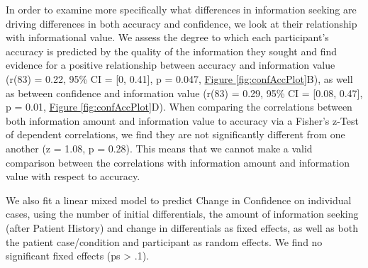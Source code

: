 \documentclass[a4paper, nobind]{templates/ociamthesis}
\begin{document}
\hfill\break
In order to examine more specifically what differences in information seeking are driving differences in both accuracy and confidence, we look at their relationship with informational value. We assess the degree to which each participant's accuracy is predicted by the quality of the information they sought and find evidence for a positive relationship between accuracy and information value (r(83) = 0.22, 95\% CI = {[}0, 0.41{]}, p = 0.047, \hyperref[fig:confAccPlot]{Figure \ref{fig:confAccPlot}}B), as well as between confidence and information value (r(83) = 0.29, 95\% CI = {[}0.08, 0.47{]}, p = 0.01, \hyperref[fig:confAccPlot]{Figure \ref{fig:confAccPlot}}D). When comparing the correlations between both information amount and information value to accuracy via a Fisher's z-Test of dependent correlations, we find they are not significantly different from one another (z = 1.08, p = 0.28). This means that we cannot make a valid comparison between the correlations with information amount and information value with respect to accuracy.

\hfill\break
We also fit a linear mixed model to predict Change in Confidence on individual cases, using the number of initial differentials, the amount of information seeking (after Patient History) and change in differentials as fixed effects, as well as both the patient case/condition and participant as random effects. We find no significant fixed effects (ps \textgreater{} .1).

\newpage
\end{document}
